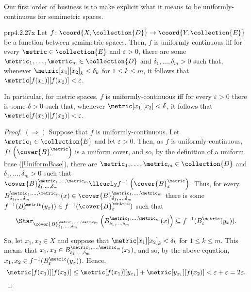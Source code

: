 Our first order of business is to make explicit what it means to be uniformly-continuous for semimetric spaces.
\begin{prp}{}{prp4.2.27x}
Let $f\colon \coord{X,\collection{D}}\rightarrow \coord{Y,\collection{E}}$ be a function between semimetric spaces.  Then, $f$ is uniformly continuous iff for every $\metric \in \collection{E}$ and $\varepsilon >0$, there are some $\metric _1,\ldots ,\metric _m\in \collection{D}$ and $\delta _1,\ldots ,\delta _m>0$ such that, whenever $\metric[x_1][x_2]_k<\delta _k$ for $1\leq k\leq m$, it follows that $\metric[f(x_1)][f(x_2)]<\varepsilon$.
\begin{rmk}
In particular, for metric spaces, $f$ is uniformly-continuous iff for every $\varepsilon >0$ there is some $\delta >0$ such that, whenever $\metric[x_1][x_2]<\delta$, it follows that $\metric[f(x_1)][f(x_2)]<\varepsilon$.
\end{rmk}
\begin{proof}
$(\Rightarrow )$ Suppose that $f$ is uniformly-continuous.  Let $\metric _1\in \collection{E}$ and let $\varepsilon >0$.  Then, as $f$ is uniformly-continuous, $f^{_1}\left( \cover{B}_{\varepsilon}^{\metric}\right)$ is a uniform cover, and so, by the definition of a uniform base (\cref{UniformBase}), there are $\metric _1,\ldots ,\metric _m\in \collection{D}$ and $\delta _1,\ldots ,\delta _m>0$ such that $\cover{B}_{\delta _1,\ldots ,\delta _m}^{\metric _1,\ldots ,\metric _m}\llcurly f^{-1}\left( \cover{B}_{\varepsilon}^{\metric}\right)$.  Thus, for every $B_{\delta _1,\ldots ,\delta _m}^{\metric _1,\ldots ,\metric _m}(x)\in \cover{B}_{\delta _1,\ldots ,\delta _m}^{\metric _1,\ldots ,\metric _m}$ there is some $f^{-1}(B_{\varepsilon}^{\metric}(y_x))\in f^{-1}(\cover{B}_{\varepsilon}^{\metric})$ such that
\begin{equation}
\Star _{\cover{B}_{\delta _1,\ldots ,\delta _m}^{\metric _1,\ldots ,\metric _m}}\left( B_{\delta _1,\ldots ,\delta _m}^{\metric _1,\ldots ,\metric _m}(x)\right) \subseteq f^{-1}(B_{\varepsilon}^{\metric}(y_x)).
\end{equation}

So, let $x_1,x_2\in X$ and suppose that $\metric[x_1][x_2]_k<\delta _k$ for $1\leq k\leq m$.  This means that $x_1,x_2\in B_{\delta _1,\ldots ,\delta _m}^{\metric _1,\ldots ,\metric _m}(x_2)$, and so, by the above equation, $x_1,x_2\in f^{-1}(B_{\varepsilon}^{\metric}(y_x))$.  Hence,
\begin{equation}
\metric[f(x_1)][f(x_2)]\leq \metric[f(x_1)][y_{x_1}]+\metric[y_{x_1}][f(x_2)]<\varepsilon +\varepsilon =2\varepsilon .
\end{equation}


\end{proof}
\end{prp}
